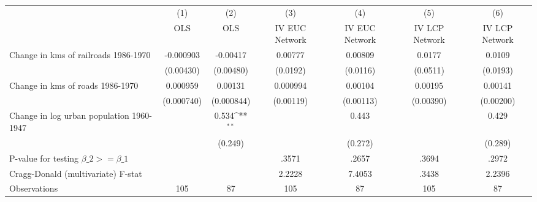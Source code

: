 {
\def\sym#1{\ifmmode^{#1}\else\(^{#1}\)\fi}
\begin{tabular}{l*{6}{c}}
\hline\hline
                &\multicolumn{1}{c}{(1)}&\multicolumn{1}{c}{(2)}&\multicolumn{1}{c}{(3)}&\multicolumn{1}{c}{(4)}&\multicolumn{1}{c}{(5)}&\multicolumn{1}{c}{(6)}\\
                &\multicolumn{1}{c}{OLS}&\multicolumn{1}{c}{OLS}&\multicolumn{1}{c}{IV EUC Network}&\multicolumn{1}{c}{IV EUC Network}&\multicolumn{1}{c}{IV LCP Network}&\multicolumn{1}{c}{IV LCP Network}\\
\hline
Change in kms of railroads 1986-1970&-0.000903         & -0.00417         &  0.00777         &  0.00809         &   0.0177         &   0.0109         \\
                &(0.00430)         &(0.00480)         & (0.0192)         & (0.0116)         & (0.0511)         & (0.0193)         \\
[1em]
Change in kms of roads 1986-1970& 0.000959         &  0.00131         & 0.000994         &  0.00104         &  0.00195         &  0.00141         \\
                &(0.000740)         &(0.000844)         &(0.00119)         &(0.00113)         &(0.00390)         &(0.00200)         \\
[1em]
Change in log urban population 1960-1947&                  &    0.534\sym{**} &                  &    0.443         &                  &    0.429         \\
                &                  &  (0.249)         &                  &  (0.272)         &                  &  (0.289)         \\
\hline
P-value for testing $\beta\_{2} >= \beta\_{1}$&                  &                  &    .3571         &    .2657         &    .3694         &    .2972         \\
Cragg-Donald (multivariate) F-stat&                  &                  &   2.2228         &   7.4053         &    .3438         &   2.2396         \\
Observations    &      105         &       87         &      105         &       87         &      105         &       87         \\
\hline\hline
\end{tabular}
}

